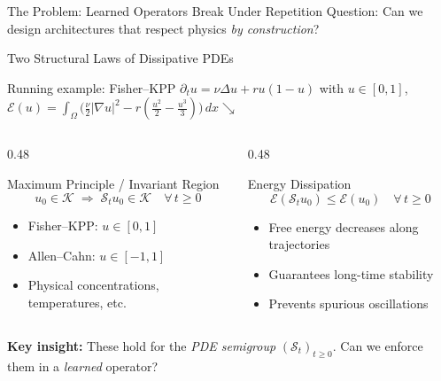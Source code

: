 \documentclass[aspectratio=169, 11pt]{beamer}
\newcommand{\cK}{\mathcal{K}}
\newcommand{\cE}{\mathcal{E}}
\newcommand{\cS}{\mathcal{S}}
\begin{document}
\begin{frame}{The Problem: Learned Operators Break Under Repetition}
\vspace{0.2cm}
\centering
\alert{Question: Can we design architectures that respect physics \emph{by construction}?}
\end{frame}

\begin{frame}{Two Structural Laws of Dissipative PDEs}

\begin{exampleblock}{Running example: Fisher--KPP}
$\partial_t u = \nu\Delta u + ru(1{-}u)$ \quad with \quad $u \in [0,1]$, \quad $\cE(u) = \int_\Omega\bigl(\tfrac{\nu}{2}|\nabla u|^2 - r(\tfrac{u^2}{2}-\tfrac{u^3}{3})\bigr)\,dx \searrow$
\end{exampleblock}

\begin{columns}[T]
\begin{column}{0.48\textwidth}
\begin{block}{Maximum Principle / Invariant Region}
\[
u_0 \in \cK \;\Longrightarrow\; \cS_t u_0 \in \cK \quad \forall\, t \geq 0
\]
\begin{itemize}
    \item Fisher--KPP: $u \in [0,1]$
    \item Allen--Cahn: $u \in [-1,1]$
    \item Physical concentrations, temperatures, etc.
\end{itemize}
\end{block}
\end{column}

\begin{column}{0.48\textwidth}
\begin{block}{Energy Dissipation}
\[
\cE(\cS_t u_0) \leq \cE(u_0) \quad \forall\, t \geq 0
\]
\begin{itemize}
    \item Free energy decreases along trajectories
    \item Guarantees long-time stability
    \item Prevents spurious oscillations
\end{itemize}
\end{block}
\end{column}
\end{columns}

\vspace{0.3cm}
\centering
\textbf{Key insight:} These hold for the \emph{PDE semigroup} $(\cS_t)_{t\geq 0}$.
Can we enforce them in a \emph{learned} operator?
\end{frame}
\end{document}
